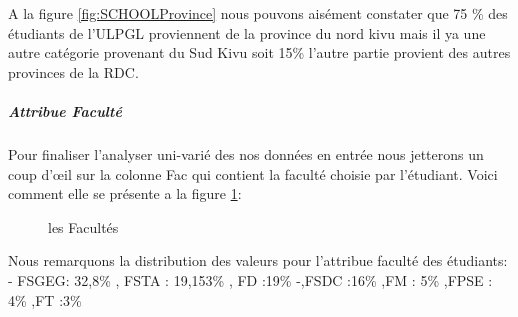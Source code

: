 A la figure \ref{fig:SCHOOLProvince} nous pouvons aisément constater que 75 \% des étudiants
de l'\ac{ULPGL} proviennent de la province du nord kivu mais il ya une autre
catégorie provenant  du Sud Kivu soit 15\% l'autre partie provient des autres provinces de la \ac{RDC}.
\subparagraph{Attribue Faculté}
Pour finaliser l'analyser uni-varié des nos données en entrée nous jetterons un coup d'œil sur la colonne Fac qui contient la faculté choisie par l'étudiant.
Voici comment elle se présente a la figure \ref{fig:FAC}:
\begin{figure}[!htbp]
	\centering
	\caption[Short caption]{les Facultés }
	\label{fig:FAC}
\end{figure}
 Nous remarquons la distribution des valeurs pour
l'attribue faculté des étudiants: - FSGEG: 32,8\% , FSTA : 19,153\% , FD
:19\% -,FSDC :16\% ,FM : 5\% ,FPSE : 4\% ,FT :3\%
